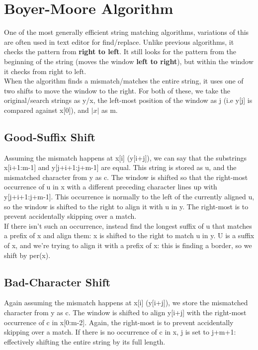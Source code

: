 \section{Boyer-Moore Algorithm}
One of the most generally efficient string matching algorithms, variations of this are often used in text editor for find/replace. Unlike previous algorithms, it checks the pattern from \textbf{right to left}. It still looks for the pattern from the beginning of the string (moves the window \textbf{left to right}), but within the window it checks from right to left. \\
When the algorithm finds a mismatch/matches the entire string, it uses one of two shifts to move the window to the right. For both of these, we take the original/search strings as y/x, the left-most position of the window as j (i.e y[j] is compared against x[0]), and $|x|$ as m. 

\subsection{Good-Suffix Shift}
Assuming the mismatch happens at x[i] (y[i+j]), we can say that the substrings\\ x[i+1:m-1] and y[j+i+1:j+m-1] are equal. This string is stored as u, and the mismatched character from y as c. The window is shifted so that the right-most occurrence of u in x with a different preceding character lines up with y[j+i+1:j+m-1]. This occurrence is normally to the left of the currently aligned u, so the window is shifted to the right to align it with u in y. The right-most is to prevent accidentally skipping over a match. \\
If there isn't such an occurrence, instead find the longest suffix of u that matches a prefix of x and align them: x is shifted to the right to match u in y. U is a suffix of x, and we're trying to align it with a prefix of x: this is finding a border, so we shift by per(x).

\subsection{Bad-Character Shift}
Again assuming the mismatch happens at x[i] (y[i+j]), we store the mismatched character from y as c. The window is shifted to align y[i+j] with the right-most occurrence of c in x[0:m-2]. Again, the right-most is to prevent accidentally skipping over a match. If there is no occurrence of c in x, j is set to j+m+1: effectively shifting the entire string by its full length.

